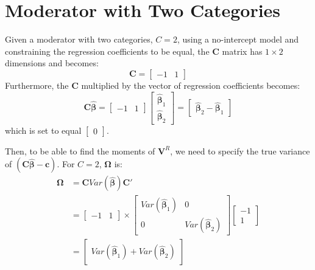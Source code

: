 \chapter{Moderator with Two Categories} \label{App: twocat}

Given a moderator with two categories, $C=2$, using a no-intercept model and constraining the regression coefficients to be equal, the $\mathbf{C}$ matrix has $1 \times 2$ dimensions and becomes:
 \begin{equation}
     \mathbf{C} = 
     \begin{bmatrix} 
     -1 & 1 
     \end{bmatrix}
     \nonumber
 \end{equation}
Furthermore, the $\mathbf{C}$ multiplied by the vector of regression coefficients becomes:
 \begin{equation}
     \mathbf{C} \bm{\hat{\beta}}= 
     \begin{bmatrix} 
     -1 & 1 \end{bmatrix}\begin{bmatrix}\bm{\hat{\beta}}_1 \\
     \bm{\hat{\beta}}_2 \end{bmatrix}  = \begin{bmatrix}
         \bm{\hat{\beta}}_2 - \bm{\hat{\beta} }_1
     \end{bmatrix}
     \nonumber
 \end{equation}
 which is set to equal $\begin{bmatrix}
     0 
 \end{bmatrix}$. 

 Then, to be able to find the moments of $\mathbf{V}^R$, we need to specify the true variance of $(\mathbf{C}\bm{\hat{\beta}}-\mathbf{c})$. For $C = 2$,  $\mathbf{\Omega}$ is:
 \begin{equation}
     \begin{split}
         \mathbf{\Omega}  &= \mathbf{C}Var(\bm{\hat{\beta}}) \mathbf{C}' \\
         &= \begin{bmatrix} 
      -1 & 1 
     \end{bmatrix} \times \begin{bmatrix}
         Var(\bm{\hat{\beta}}_1) & 0  \\
         0 & Var(\bm{\hat{\beta}}_2) 
     \end{bmatrix} \begin{bmatrix} 
     -1  \\
     1  
     \end{bmatrix} \\
    &= \begin{bmatrix}
        Var(\bm{\hat{\beta}}_1) + Var(\bm{\hat{\beta}}_2) 
    \end{bmatrix} 
     \end{split}
     \nonumber
 \end{equation}
 

